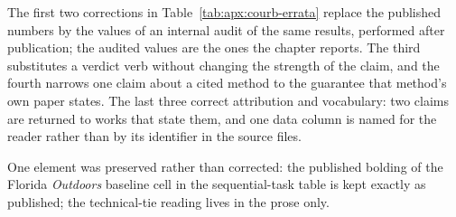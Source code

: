 The first two corrections in Table~\ref{tab:apx:courb-errata} replace the published
numbers by the values of an internal audit of the same results, performed after
publication; the audited values are the ones the chapter reports. The third substitutes a
verdict verb without changing the strength of the claim, and the fourth narrows one claim
about a cited method to the guarantee that method's own paper states. The last three correct
attribution and vocabulary: two claims are returned to works that state them, and one data
column is named for the reader rather than by its identifier in the source files.



One element was preserved rather than corrected: the published bolding of the Florida
\emph{Outdoors} baseline cell in the sequential-task table is kept exactly as
published; the technical-tie reading lives in the prose only.


